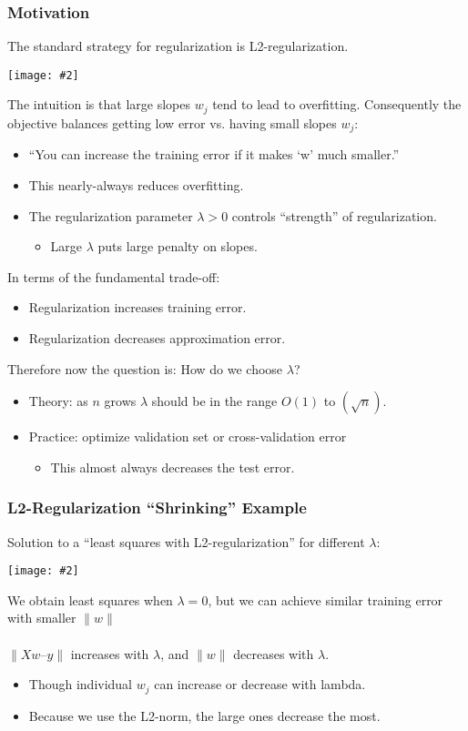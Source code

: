 \documentclass{article}
\def\blu#1{{\color{blu}#1}}
\def\gre#1{{\color{gre}#1}}
\def\red#1{{\color{red}#1}}
\def\norm#1{\|#1\|}
\theoremstyle{definition}
\newcommand{\centerfig}[2]{\begin{center}\texttt{[image: \#2]}\end{center}}
\begin{document}
\subsubsection*{Motivation}

The standard strategy for \blu{regularization} is \blu{L2-regularization}. 
\centerfig{0.75}{L2-reg-1}
The intuition is that \red{large slopes $ w_j $} tend to lead to overfitting. Consequently the objective \gre{balances getting low error vs. having small slopes} $ w_j $:
\begin{itemize}
	\item “You can increase the training error if it makes ‘w’ much smaller.”
	\item This nearly-always reduces overfitting.
	\item The regularization parameter $\lambda > 0$ controls “strength” of regularization. 
	\begin{itemize}
		\item Large $\lambda$ puts large penalty on slopes.
	\end{itemize}
\end{itemize}
In terms of the fundamental trade-off:
\begin{itemize}
	\item Regularization \red{increases training error}.
	\item Regularization \gre{decreases approximation error}.
\end{itemize}
Therefore now the question is: How do we choose $\lambda$?
\begin{itemize}
	\item Theory: as $ n $ grows $\lambda$ should be in the range $ O(1) $ to $ (\sqrt{n}) $.
	\item Practice: optimize \blu{validation set} or \blu{cross-validation error}
	\begin{itemize}
		\item \gre{This almost always decreases the test error.}
	\end{itemize}
\end{itemize}
\subsubsection*{L2-Regularization “Shrinking” Example}
Solution to a “\blu{least squares with L2-regularization}” for \gre{different $\lambda$}:
\centerfig{0.9}{L2-reg-ex1}
We obtain \gre{least squares when $\lambda = 0$}, but we can achieve similar training error with smaller $ \norm{w} $ \\ \\
$ \norm{Xw –y} $ increases with $\lambda$, and $ \norm{w} $ decreases with $\lambda$.
\begin{itemize}
	\item Though individual $ w_j $ can increase or decrease with lambda.
	\item Because we use the L2-norm, the large ones decrease the most.
\end{itemize}
\end{document}
